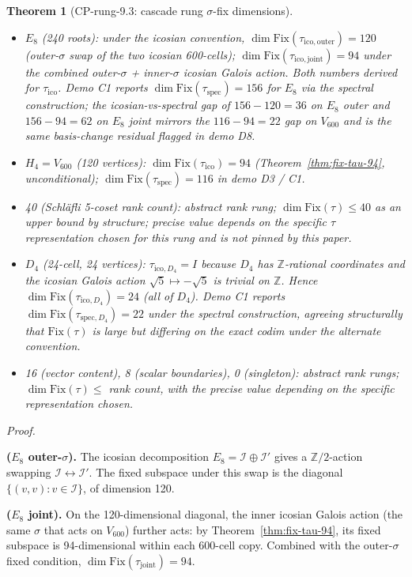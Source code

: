 \documentclass[11pt]{article}
\theoremstyle{plain}
\newtheorem{theorem}{Theorem}[section]
\theoremstyle{definition}
\theoremstyle{remark}
\newcommand{\Ical}{\mathcal{I}}
\newcommand{\Fix}{\mathrm{Fix}}
\begin{document}
\begin{theorem}[CP-rung-9.3: cascade rung $\sigma$-fix dimensions]
\begin{itemize}[leftmargin=2em]
\item $E_8$ (240 roots): under the icosian convention, $\dim \Fix(\tau_{\mathrm{ico,outer}}) = 120$ (outer-$\sigma$ swap of the two icosian 600-cells); $\dim \Fix(\tau_{\mathrm{ico,joint}}) = 94$ under the combined outer-$\sigma$ + inner-$\sigma$ icosian Galois action. Both numbers derived for $\tau_{\mathrm{ico}}$. Demo C1 reports $\dim \Fix(\tau_{\mathrm{spec}}) = 156$ for $E_8$ via the spectral construction; the icosian-vs-spectral gap of $156 - 120 = 36$ on $E_8$ outer and $156 - 94 = 62$ on $E_8$ joint mirrors the $116 - 94 = 22$ gap on $V_{600}$ and is the same basis-change residual flagged in demo D8.
\item $H_4 = V_{600}$ (120 vertices): $\dim \Fix(\tau_{\mathrm{ico}}) = 94$ (Theorem~\ref{thm:fix-tau-94}, unconditional); $\dim \Fix(\tau_{\mathrm{spec}}) = 116$ in demo D3 / C1.
\item 40 (Schläfli 5-coset rank count): abstract rank rung; $\dim \Fix(\tau) \leq 40$ as an upper bound by structure; precise value depends on the specific $\tau$ representation chosen for this rung and is not pinned by this paper.
\item $D_4$ (24-cell, 24 vertices): $\tau_{\mathrm{ico},D_4} = I$ because $D_4$ has $\mathbb{Z}$-rational coordinates and the icosian Galois action $\sqrt 5 \mapsto -\sqrt 5$ is trivial on $\mathbb{Z}$. Hence $\dim \Fix(\tau_{\mathrm{ico},D_4}) = 24$ (all of $D_4$). Demo C1 reports $\dim \Fix(\tau_{\mathrm{spec},D_4}) = 22$ under the spectral construction, agreeing structurally that $\Fix(\tau)$ is large but differing on the exact codim under the alternate convention.
\item 16 (vector content), 8 (scalar boundaries), 0 (singleton): abstract rank rungs; $\dim \Fix(\tau) \leq$ rank count, with the precise value depending on the specific representation chosen.
\end{itemize}
\end{theorem}

\noindent\emph{Proof.}

\textbf{($E_8$ outer-$\sigma$).} The icosian decomposition $E_8 = \Ical \oplus \Ical'$ gives a $\mathbb{Z}/2$-action swapping $\Ical \leftrightarrow \Ical'$. The fixed subspace under this swap is the diagonal $\{(v, v) : v \in \Ical\}$, of dimension 120.

\textbf{($E_8$ joint).} On the 120-dimensional diagonal, the inner icosian Galois action (the same $\sigma$ that acts on $V_{600}$) further acts: by Theorem~\ref{thm:fix-tau-94}, its fixed subspace is 94-dimensional within each 600-cell copy. Combined with the outer-$\sigma$ fixed condition, $\dim \Fix(\tau_{\mathrm{joint}}) = 94$.
\end{document}

